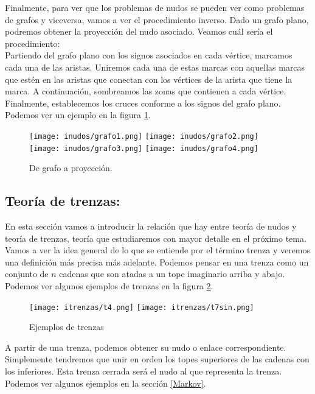 Finalmente, para ver que los problemas de nudos se pueden ver como problemas de grafos y viceversa, vamos a ver el procedimiento inverso. Dado un grafo plano, podremos obtener la proyección del nudo asociado. Veamos cuál sería el procedimiento:\\

Partiendo del grafo plano con los signos asociados en cada vértice, marcamos cada una de las aristas. Uniremos cada una de estas marcas con aquellas marcas que estén en las aristas que conectan con los vértices de la arista que tiene la marca. A continuación, sombreamos las zonas que contienen a cada vértice. Finalmente, establecemos los cruces conforme a los signos del grafo plano. Podemos ver un ejemplo en la figura \ref{graf3}.\\
\begin{figure}[h!]
	\centering
	\texttt{[image: inudos/grafo1.png]}
	\texttt{[image: inudos/grafo2.png]}
	\texttt{[image: inudos/grafo3.png]}
	\texttt{[image: inudos/grafo4.png]}
	\caption{De grafo a proyección.}
	\label{graf3} 
\end{figure}



\begin{center}
	\item \subsection{Teoría de trenzas:}
\end{center}
En esta sección vamos a introducir la relación que hay entre teoría de nudos y teoría de trenzas, teoría que estudiaremos con mayor detalle en el próximo tema.\\

Vamos a ver la idea general de lo que se entiende por el término trenza y veremos una definición más precisa más adelante. Podemos pensar en una trenza como un conjunto de $n$ cadenas que son atadas a un tope imaginario arriba y abajo. Podemos ver algunos ejemplos de trenzas en la figura \ref{ntren1}.\\
   \begin{figure}[h!]
   	\centering
   	\texttt{[image: itrenzas/t4.png]}
   	\space
   	\texttt{[image: itrenzas/t7sin.png]}
   	\caption{Ejemplos de trenzas}
   	\label{ntren1} 
   \end{figure} 

A partir de una trenza, podemos obtener su nudo o enlace correspondiente. Simplemente tendremos que unir en orden  los topes superiores de las cadenas con los inferiores. Esta trenza cerrada será el nudo al que representa la trenza. Podemos ver algunos ejemplos en la sección \ref{Markov}.\\

